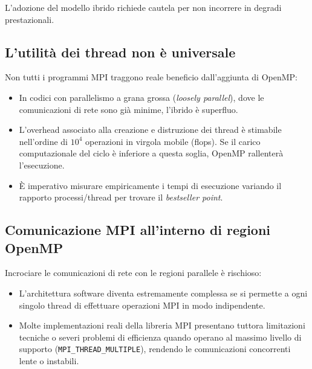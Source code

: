 L'adozione del modello ibrido richiede cautela per non incorrere in degradi prestazionali.

\subsection*{L'utilità dei thread non è universale}
Non tutti i programmi MPI traggono reale beneficio dall'aggiunta di OpenMP:
\begin{itemize}
    \item In codici con parallelismo a grana grossa (\textit{loosely parallel}), dove le comunicazioni di rete sono già minime, l'ibrido è superfluo.
    \item L'overhead associato alla creazione e distruzione dei thread è stimabile nell'ordine di $10^4$ operazioni in virgola mobile (flops). Se il carico computazionale del ciclo è inferiore a questa soglia, OpenMP rallenterà l'esecuzione.
    \item È imperativo misurare empiricamente i tempi di esecuzione variando il rapporto processi/thread per trovare il \textit{bestseller point}.
\end{itemize}

\subsection*{Comunicazione MPI all'interno di regioni OpenMP}
Incrociare le comunicazioni di rete con le regioni parallele è rischioso:
\begin{itemize}
    \item L'architettura software diventa estremamente complessa se si permette a ogni singolo thread di effettuare operazioni MPI in modo indipendente.
    \item Molte implementazioni reali della libreria MPI presentano tuttora limitazioni tecniche o severi problemi di efficienza quando operano al massimo livello di supporto (\texttt{MPI\_THREAD\_MULTIPLE}), rendendo le comunicazioni concorrenti lente o instabili.
\end{itemize}